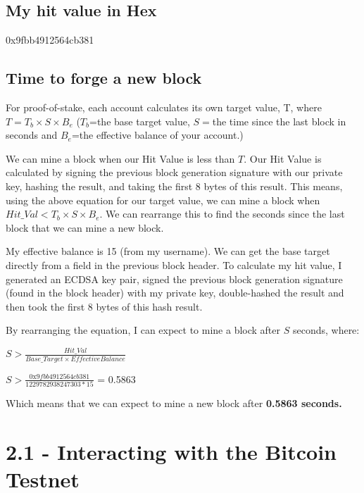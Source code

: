 \documentclass[11pt]{article}
\begin{document}
	\subsection*{My hit value in Hex}
	0x9fbb4912564cb381
	
	\subsection*{Time to forge a new block}
	For proof-of-stake, each account calculates its own target value, T, where $T = T_b \times S \times B_e$ ($T_b$=the base target value, $S=$the time since the last block in seconds and $B_e$=the effective balance of your account.) \newline
	
	We can mine a block when our Hit Value is less than $T$. Our Hit Value is calculated by signing the previous block generation signature with our private key, hashing the result, and taking the first 8 bytes of this result. This means, using the above equation for our target value, we can mine a block when $Hit\_Val < T_b \times S \times B_e$. We can rearrange this to find the seconds since the last block that we can mine a new block. \newline
	
	My effective balance is 15 (from my username). We can get the base target directly from a field in the previous block header. To calculate my hit value, I generated an ECDSA key pair, signed the previous block generation signature (found in the block header) with my private key, double-hashed the result and then took the first 8 bytes of this hash result. \newline
	
	By rearranging the equation, I can expect to mine a block after $S$ seconds, where: \newline
	
	$S > \frac{Hit\_Val}{Base\_Target \times EffectiveBalance}$ \newline
	
	$S > \frac{\text{0x}9fbb4912564cb381}{1229782938247303*15}$ = 0.5863 \newline
	
	Which means that we can expect to mine a new block after \textbf{0.5863 seconds.}
	\newpage
	
	
	\section*{2.1 - Interacting with the Bitcoin Testnet}
\end{document}
